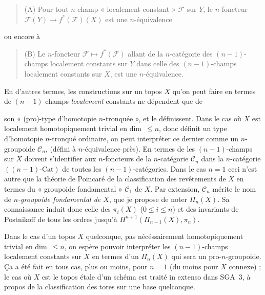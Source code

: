 \documentclass[11pt,a4paper]{article}
\begin{document}
\begin{quote}
(A) Pour tout $n$-champ « localement constant » $\mathcal{F}$ sur $Y$, le $n$-foncteur $\mathcal{F}(Y) \to f^*(\mathcal{F})(X)$ est une $n$-équivalence
\end{quote}

ou encore à

\begin{quote}
(B) Le $n$-foncteur $\mathcal{F} \mapsto f^*(\mathcal{F})$ allant de la $n$-catégorie des $(n-1)$-champs localement constants sur $Y$ dans celle des $(n-1)$-champs localement constants sur $X$, est une $n$-équivalence.
\end{quote}

En d'autres termes, les constructions sur un topos $X$ qu'on peut faire en termes de $(n-1)$ champs \emph{localement} constants ne dépendent que de

son « (pro)-type d'homotopie $n$-tronquée », et le définissent. Dans le cas où $X$ est localement homotopiquement trivial en dim~$\leqslant n$, donc définit un type d'homotopie $n$-tronqué ordinaire, on peut interpréter ce dernier comme un $n$-groupoide $\mathcal{C}_n$, (défini à $n$-équivalence près). En termes de \struck{\ill{}}  les $(n-1)$-champs  sur $X$ doivent s'identifier aux $n$-foncteurs de la $n$-catégorie $\mathcal{C}_n$ dans la $n$-catégorie $((n-1)\text{-}\mathrm{Cat})$ de toutes les $(n-1)$-catégories. Dans le cas $n = 1$ ceci n'est autre que la théorie de Poincaré de la classification des revêtements de $X$ en termes du « groupoide fondamental » $\mathcal{C}_1$ de $X$. Par extension, $\mathcal{C}_n$ mérite le nom de \emph{$n$-groupoide fondamental de $X$}, que je propose de noter $\Pi_n(X)$. Sa connaissance induit donc celle des $\pi_i(X)$ ($0 \leqslant i \leqslant n$) et des invariants de Postnikoff de tous les ordres jusqu'à $H^{n+1}(\Pi_{n-1}(X), \pi_n)$.

Dans le cas d'un topos $X$ quelconque, pas nécéssairement  homotopiquement trivial en dim~$\leqslant n$, on espère pouvoir interpréter les $(n-1)$-champs localement constants sur $X$ en termes d'un $\Pi_n(X)$ qui sera un pro-$n$-groupoide. Ça a été fait en tous cas, plus ou moins, pour $n = 1$ (du moins pour $X$ connexe) ; le cas où $X$ est le topos étale d'un schéma est traité in extenso dans SGA~3, à propos de la classification des tores sur une base quelconque.
\end{document}
